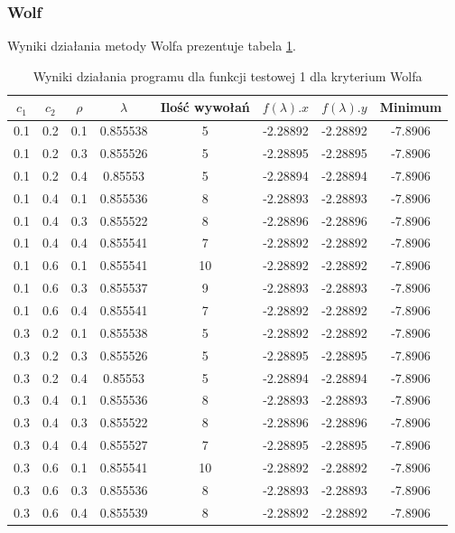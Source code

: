 \documentclass{classrep}
\begin{document}
\subsubsection{Wolf}

Wyniki działania metody Wolfa prezentuje tabela \ref{wolf1}.

\begin{table}
  \centering
  \caption{Wyniki działania programu dla funkcji testowej 1 dla kryterium Wolfa}
  \label{wolf1}
  \begin{tabular}{|c|c|c|c|c|c|c|c|}
    \hline
    $c_1$ & $c_2$ & $\rho$ & $\lambda$ & Ilość wywołań & $f(\lambda).x$ & $f(\lambda).y$ & Minimum \\
    \hline
    0.1 & 0.2 & 0.1 & 0.855538 & 5 & -2.28892 & -2.28892 & -7.8906 \\
    0.1 & 0.2 & 0.3 & 0.855526 & 5 & -2.28895 & -2.28895 & -7.8906 \\
    0.1 & 0.2 & 0.4 & 0.85553 & 5 & -2.28894 & -2.28894 & -7.8906 \\
    0.1 & 0.4 & 0.1 & 0.855536 & 8 & -2.28893 & -2.28893 & -7.8906 \\
    0.1 & 0.4 & 0.3 & 0.855522 & 8 & -2.28896 & -2.28896 & -7.8906 \\
    0.1 & 0.4 & 0.4 & 0.855541 & 7 & -2.28892 & -2.28892 & -7.8906 \\
    0.1 & 0.6 & 0.1 & 0.855541 & 10 & -2.28892 & -2.28892 & -7.8906 \\
    0.1 & 0.6 & 0.3 & 0.855537 & 9 & -2.28893 & -2.28893 & -7.8906 \\
    0.1 & 0.6 & 0.4 & 0.855541 & 7 & -2.28892 & -2.28892 & -7.8906 \\
    0.3 & 0.2 & 0.1 & 0.855538 & 5 & -2.28892 & -2.28892 & -7.8906 \\
    0.3 & 0.2 & 0.3 & 0.855526 & 5 & -2.28895 & -2.28895 & -7.8906 \\
    0.3 & 0.2 & 0.4 & 0.85553 & 5 & -2.28894 & -2.28894 & -7.8906 \\
    0.3 & 0.4 & 0.1 & 0.855536 & 8 & -2.28893 & -2.28893 & -7.8906 \\
    0.3 & 0.4 & 0.3 & 0.855522 & 8 & -2.28896 & -2.28896 & -7.8906 \\
    0.3 & 0.4 & 0.4 & 0.855527 & 7 & -2.28895 & -2.28895 & -7.8906 \\
    0.3 & 0.6 & 0.1 & 0.855541 & 10 & -2.28892 & -2.28892 & -7.8906 \\
    0.3 & 0.6 & 0.3 & 0.855536 & 8 & -2.28893 & -2.28893 & -7.8906 \\
    0.3 & 0.6 & 0.4 & 0.855539 & 8 & -2.28892 & -2.28892 & -7.8906 \\

\end{tabular}
\end{table}
\end{document}
